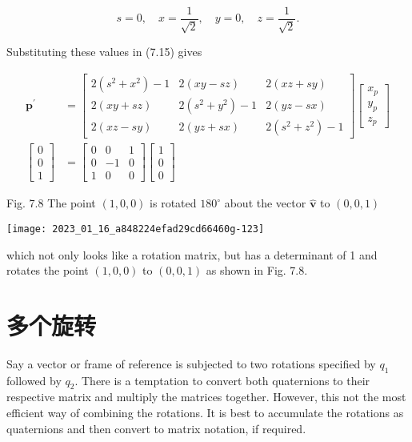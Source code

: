 $$
s=0, \quad x=\frac{1}{\sqrt{2}}, \quad y=0, \quad z=\frac{1}{\sqrt{2}} .
$$

Substituting these values in (7.15) gives

$$
\begin{aligned}
\mathbf{p}^{\prime} & =\left[\begin{array}{ccc}
2\left(s^{2}+x^{2}\right)-1 & 2(x y-s z) & 2(x z+s y) \\
2(x y+s z) & 2\left(s^{2}+y^{2}\right)-1 & 2(y z-s x) \\
2(x z-s y) & 2(y z+s x) & 2\left(s^{2}+z^{2}\right)-1
\end{array}\right]\left[\begin{array}{l}
x_{p} \\
y_{p} \\
z_{p}
\end{array}\right] \\
{\left[\begin{array}{l}
0 \\
0 \\
1
\end{array}\right] } & =\left[\begin{array}{ccc}
0 & 0 & 1 \\
0 & -1 & 0 \\
1 & 0 & 0
\end{array}\right]\left[\begin{array}{l}
1 \\
0 \\
0
\end{array}\right]
\end{aligned}
$$

Fig. 7.8 The point $(1,0,0)$ is rotated $180^{\circ}$ about the vector $\hat{\mathbf{v}}$ to $(0,0,1)$

\begin{center}
\texttt{[image: 2023\_01\_16\_a848224efad29cd66460g-123]}
\end{center}

which not only looks like a rotation matrix, but has a determinant of 1 and rotates the point $(1,0,0)$ to $(0,0,1)$ as shown in Fig. 7.8.

\section{多个旋转}
Say a vector or frame of reference is subjected to two rotations specified by $q_{1}$ followed by $q_{2}$. There is a temptation to convert both quaternions to their respective matrix and multiply the matrices together. However, this not the most efficient way of combining the rotations. It is best to accumulate the rotations as quaternions and then convert to matrix notation, if required.

